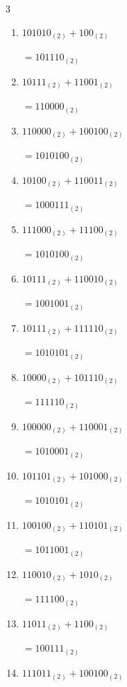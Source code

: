 \begin{multicols}{3}
\begin{enumerate}
        $=1101_{(2)}$

  \item $101010_{(2)} + 100_{(2)}$

        $=101110_{(2)}$

  \item $10111_{(2)} + 11001_{(2)}$

        $=110000_{(2)}$

  \item $110000_{(2)} + 100100_{(2)}$

        $=1010100_{(2)}$

  \item $10100_{(2)} + 110011_{(2)}$

        $=1000111_{(2)}$

  \item $111000_{(2)} + 11100_{(2)}$

        $=1010100_{(2)}$

  \item $10111_{(2)} + 110010_{(2)}$

        $=1001001_{(2)}$

\columnbreak %

\resetques

  \item $10111_{(2)} + 111110_{(2)}$

        $=1010101_{(2)}$

  \item $10000_{(2)} + 101110_{(2)}$

        $=111110_{(2)}$

  \item $100000_{(2)} + 110001_{(2)}$

        $=1010001_{(2)}$

  \item $101101_{(2)} + 101000_{(2)}$

        $=1010101_{(2)}$

  \item $100100_{(2)} + 110101_{(2)}$

        $=1011001_{(2)}$

  \item $110010_{(2)} + 1010_{(2)}$

        $=111100_{(2)}$

  \item $11011_{(2)} + 1100_{(2)}$

        $=100111_{(2)}$

  \item $111011_{(2)} + 100100_{(2)}$


\end{enumerate}
\end{multicols}
